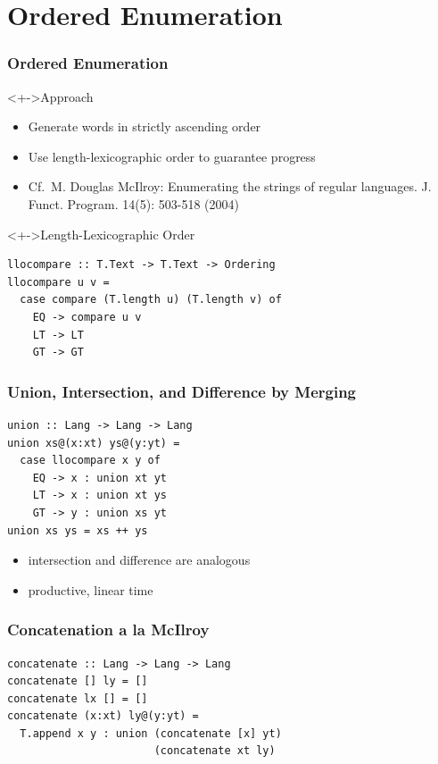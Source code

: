 \documentclass[pdftex,aspectratio=169]{beamer}
\begin{document}
\section{Ordered Enumeration}
\begin{frame}[fragile]
  \frametitle{Ordered Enumeration}
  \vspace{-\baselineskip}
  \begin{block}<+->{Approach}
    \begin{itemize}
    \item Generate words in strictly ascending order
    \item Use length-lexicographic order to guarantee progress
    \item Cf.\ M. Douglas McIlroy:
      Enumerating the strings of regular languages. J. Funct. Program. 14(5): 503-518 (2004)
    \end{itemize}
  \end{block}
  \begin{block}<+->{Length-Lexicographic Order}
\begin{lstlisting}[numbers=none]
llocompare :: T.Text -> T.Text -> Ordering
llocompare u v =
  case compare (T.length u) (T.length v) of
    EQ -> compare u v
    LT -> LT
    GT -> GT
\end{lstlisting}
  \end{block}
\end{frame}
\begin{frame}
  \frametitle{Union, Intersection, and Difference by Merging}
\begin{lstlisting}[numbers=none]
union :: Lang -> Lang -> Lang
union xs@(x:xt) ys@(y:yt) =
  case llocompare x y of
    EQ -> x : union xt yt
    LT -> x : union xt ys
    GT -> y : union xs yt
union xs ys = xs ++ ys
\end{lstlisting}
  \begin{itemize}
  \item intersection and difference are analogous
  \item productive, linear time
  \end{itemize}
\end{frame}

\begin{frame}[fragile]
  \frametitle{Concatenation a la McIlroy}
\begin{lstlisting}[numbers=none]
concatenate :: Lang -> Lang -> Lang
concatenate [] ly = []
concatenate lx [] = []
concatenate (x:xt) ly@(y:yt) =
  T.append x y : union (concatenate [x] yt) 
                       (concatenate xt ly)
\end{lstlisting}
\end{frame}
\end{document}
